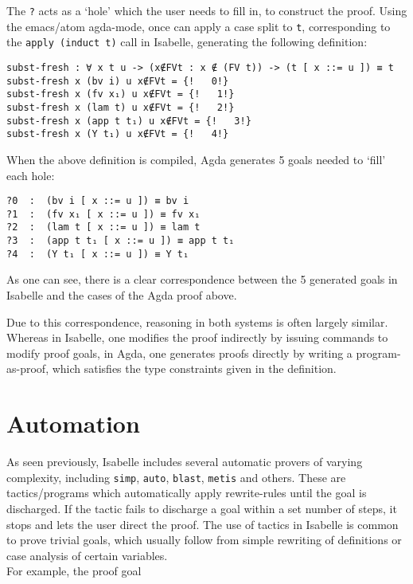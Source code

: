 \documentclass[a4paper, 12pt, twoside]{style/ociamthesis}
\theoremstyle{plain}
\theoremstyle{definition}
\theoremstyle{remark}
\begin{document}
The \texttt{?} acts as a `hole' which the user needs to fill in, to
construct the proof. Using the emacs/atom agda-mode, once can apply a
case split to \texttt{t}, corresponding to the \texttt{apply (induct t)}
call in Isabelle, generating the following definition:

\begin{verbatim}
subst-fresh : ∀ x t u -> (x∉FVt : x ∉ (FV t)) -> (t [ x ::= u ]) ≡ t
subst-fresh x (bv i) u x∉FVt = {!   0!}
subst-fresh x (fv x₁) u x∉FVt = {!   1!}
subst-fresh x (lam t) u x∉FVt = {!   2!}
subst-fresh x (app t t₁) u x∉FVt = {!   3!}
subst-fresh x (Y t₁) u x∉FVt = {!   4!}
\end{verbatim}

When the above definition is compiled, Agda generates 5 goals needed to
`fill' each hole:

\begin{verbatim}
?0  :  (bv i [ x ::= u ]) ≡ bv i
?1  :  (fv x₁ [ x ::= u ]) ≡ fv x₁
?2  :  (lam t [ x ::= u ]) ≡ lam t
?3  :  (app t t₁ [ x ::= u ]) ≡ app t t₁
?4  :  (Y t₁ [ x ::= u ]) ≡ Y t₁
\end{verbatim}

As one can see, there is a clear correspondence between the 5 generated
goals in Isabelle and the cases of the Agda proof above.

Due to this correspondence, reasoning in both systems is often largely
similar. Whereas in Isabelle, one modifies the proof indirectly by
issuing commands to modify proof goals, in Agda, one generates proofs
directly by writing a program-as-proof, which satisfies the type
constraints given in the definition.

\section{Automation}\label{automation}

As seen previously, Isabelle includes several automatic provers of
varying complexity, including \texttt{simp}, \texttt{auto},
\texttt{blast}, \texttt{metis} and others. These are tactics/programs
which automatically apply rewrite-rules until the goal is discharged. If
the tactic fails to discharge a goal within a set number of steps, it
stops and lets the user direct the proof. The use of tactics in Isabelle
is common to prove trivial goals, which usually follow from simple
rewriting of definitions or case analysis of certain variables.\\
For example, the proof goal
\end{document}
